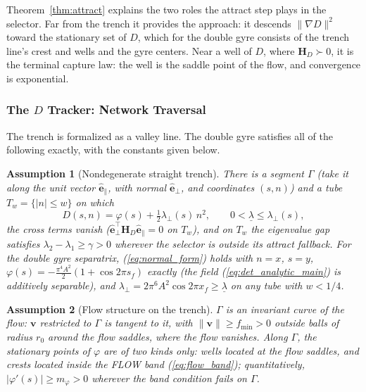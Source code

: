 \documentclass[lettersize,journal]{IEEEtran}
\newtheorem{assumption}{Assumption}
\begin{document}
Theorem~\ref{thm:attract} explains the two roles the attract step plays
in the selector. Far from the trench it provides the approach: it descends
$\|\nabla D\|^2$ toward the stationary set of $D$, which for the double
gyre consists of the trench line's crest and wells and the gyre
centers. Near a well of $D$, where $\mathbf{H}_D \succ 0$, it is the
terminal capture law: the well is the saddle point of the flow, and
convergence is exponential.

\subsubsection{The $D$ Tracker: Network Traversal}
\label{sec:stab_sep}

The trench is formalized as a valley line. The double gyre satisfies all
of the following exactly, with the constants given below.

\begin{assumption}[Nondegenerate straight trench]
\label{ass:trench}
There is a segment $\Gamma$ (take it along the unit vector
$\hat{\mathbf{e}}_\parallel$, with normal $\hat{\mathbf{e}}_\perp$, and
coordinates $(s, n)$) and a tube $T_w = \{|n| \leq w\}$ on which
\begin{equation}
    D(s, n) = \varphi(s) + \tfrac{1}{2}\lambda_\perp(s)\,n^2,
    \qquad 0 < \underline{\lambda} \leq \lambda_\perp(s),
    \label{eq:normal_form}
\end{equation}
the cross terms vanish
($\hat{\mathbf{e}}_\perp^\top \mathbf{H}_D \hat{\mathbf{e}}_\parallel
= 0$ on $T_w$), and on $T_w$ the eigenvalue gap satisfies
$\lambda_2 - \lambda_1 \geq \gamma > 0$ wherever the selector is
outside its attract fallback. For the double gyre separatrix,
(\ref{eq:normal_form}) holds with $n = x$, $s = y$, $\varphi(s) =
-\tfrac{\pi^4 A^2}{2}(1 + \cos 2\pi s_f)$ exactly (the field
(\ref{eq:det_analytic_main}) is additively separable), and
$\lambda_\perp = 2\pi^6 A^2 \cos 2\pi x_f \geq \underline{\lambda}$ on
any tube with $w < 1/4$.
\end{assumption}

\begin{assumption}[Flow structure on the trench]
\label{ass:flow}
$\Gamma$ is an invariant curve of the flow: $\mathbf{v}$ restricted to
$\Gamma$ is tangent to it, with $\|\mathbf{v}\| \geq f_{\min} > 0$
outside balls of radius $r_0$ around the flow saddles, where the flow
vanishes. Along $\Gamma$, the stationary points of $\varphi$ are of two
kinds only: wells located at the flow saddles, and crests located inside
the FLOW band (\ref{eq:flow_band}); quantitatively, $|\varphi'(s)| \geq
m_\varphi > 0$ wherever the band condition fails on $\Gamma$.
\end{assumption}
\end{document}
